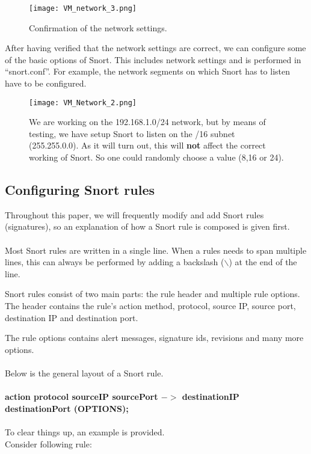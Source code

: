 \begin{figure}[h]
    \centering
    \texttt{[image: VM\_network\_3.png]}
    \caption{Confirmation of the network settings.}
\end{figure}

After having verified that the network settings are correct, we can configure some of the basic options of Snort. This includes network settings and is performed in ``snort.conf''. For example, the network segments on which Snort has to listen have to be configured.
\clearpage
\begin{figure}[h]
    \centering
    \texttt{[image: VM\_Network\_2.png]}
    \caption{We are working on the 192.168.1.0/24 network, but by means of testing, we have setup Snort to listen on the /16 subnet (255.255.0.0). As it will turn out, this will \textbf{not} affect the correct working of Snort. So one could randomly choose a value (8,16 or 24).}
\end{figure}

\newpage

\subsection{Configuring Snort rules}

Throughout this paper, we will frequently modify and add Snort rules (signatures), so an explanation of how a Snort rule is composed is given first. \\ \\
Most Snort rules are written in a single line. When a rules needs to span multiple lines, this can always be performed by adding a backslash ($\backslash$) at the end of the line.

Snort rules consist of two main parts: the rule header and multiple rule options. The header contains the rule's action method, protocol, source IP, source port, destination IP and destination port.

The rule options contains alert messages, signature ids, revisions and many more options. \\ \\
Below is the general layout of a Snort rule. \\ \\
\textbf{action protocol sourceIP sourcePort $->$ destinationIP destinationPort (OPTIONS);} \\ \\
To clear things up, an example is provided. \\
Consider following rule:

